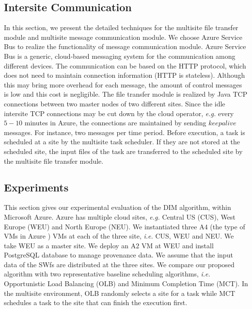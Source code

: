 \subsection{Intersite Communication}
\label{subsec:MCC}

In this section, we present the detailed techniques for the multisite file transfer module and multisite message communication module.
We choose Azure Service Bus \cite{AzureServiceBus} to realize the functionality of message communication module. Azure Service Bus is a generic, cloud-based messaging system for the communication among different devices. The communication can be based on the HTTP protocol, which does not need to maintain connection information (HTTP is stateless). Although this may bring more overhead for each message, the amount of control messages is low and this cost is negligible. 
The file transfer module is realized by Java TCP connections between two master nodes of two different sites. Since the idle intersite TCP connections may be cut down by the cloud operator, \textit{e.g.} every $5-10$ minutes in Azure, the connections are maintained by sending $keepalive$ messages. For instance, two messages per time period. Before execution, a task is scheduled at a site by the multisite task scheduler. If they are not stored at the scheduled site, the input files of the task are transferred to the scheduled site by the multisite file transfer module.

\subsection{Experiments}
\label{subsec:exp}
This section gives our experimental evaluation of the DIM algorithm, within Microsoft Azure. Azure \cite{Azure} has multiple cloud sites, \textit{e.g.} Central US (CUS), West Europe (WEU) and North Europe (NEU). 
We instantiated three A$4$ (the type of VMs in Azure \cite{AzureVM}) VMs at each of the three site, \textit{i.e.} CUS, WEU and NEU. 
We take WEU as a master site. We deploy an A$2$ VM at WEU and install PostgreSQL database to manage provenance data.
We assume that the input data of the SWfs are distributed at the three sites. 
We compare our proposed algorithm with two representative baseline scheduling algorithms, \textit{i.e.} Opportunistic Load Balancing (OLB) and Minimum Completion Time (MCT). In the multisite environment, OLB randomly selects a site for a task while MCT schedules a task to the site that can finish the execution first. 


